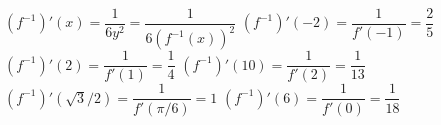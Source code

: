 \begin{Answer}\phantom{}
    \begin{multicols}{2}
		 
		\Question $(f^{-1})'(x) = \dfrac{1}{6y^2} = \dfrac{1}{6 (f^{-1}(x))^2 }$
		\Question $(f^{-1})'(-2) =  \dfrac{1}{f'(-1)} = \dfrac{2}{5}$
    	\Question $ (f^{-1})'(2)= \dfrac{1}{f'(1)} = \dfrac{1}{4}$  
    	\Question $(f^{-1})'(10)= \dfrac{1}{f'(2)} = \dfrac{1}{13}$ 
    	\Question $(f^{-1})'(\sqrt{3}/2) = \dfrac{1}{f'(\pi/6)} = 1 $
    	\Question $(f^{-1})'(6) = \dfrac{1}{f'(0)} = \dfrac{1}{18}$ 
		\EndCurrentQuestion
	\end{multicols}
\end{Answer}

\ifanalysis \pagebreak \fi


\subsection*{}
